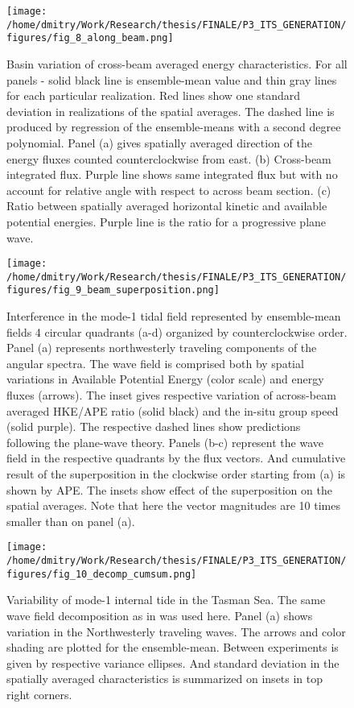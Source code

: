 \documentclass[12pt]{article}
\begin{document}
\begin{figure}
	\centering
	\texttt{[image: /home/dmitry/Work/Research/thesis/FINALE/P3\_ITS\_GENERATION/figures/fig\_8\_along\_beam.png]}
	\caption{Basin variation of cross-beam averaged energy characteristics. For all panels - solid 
	black line is ensemble-mean value and thin gray lines for each particular realization. Red 
	lines show one standard deviation in realizations of the spatial averages. The dashed line is 
	produced by regression of the ensemble-means with a second degree polynomial. Panel (a) gives 
	spatially averaged direction of the energy fluxes counted counterclockwise from east. (b) 
	Cross-beam integrated flux. Purple line shows same integrated flux but with no account for 
	relative angle with respect to across beam section. (c) Ratio between spatially averaged 
	horizontal kinetic and available potential energies. Purple line is the ratio for a progressive 
	plane wave.}
	\label{C3.fig:beam_prms}
\end{figure}

\begin{figure}
	\centering
	\texttt{[image: /home/dmitry/Work/Research/thesis/FINALE/P3\_ITS\_GENERATION/figures/fig\_9\_beam\_superposition.png]}
	\caption{Interference in the mode-1 tidal field represented by ensemble-mean fields 4 circular 	
	quadrants (a-d) organized by counterclockwise order. Panel (a) represents northwesterly 
	traveling components of the angular spectra. The wave field is comprised both by spatial 
	variations in Available Potential Energy (color scale) and energy fluxes (arrows). The inset 
	gives respective variation of across-beam averaged HKE/APE ratio (solid black) and the in-situ 
	group speed (solid purple). The respective dashed lines show predictions following the  
	plane-wave theory. Panels (b-c) represent the wave field in the respective quadrants by the 
	flux vectors. And cumulative result of the superposition in the clockwise order starting from 
	(a) is shown by APE. The insets show effect of the superposition on the spatial averages. Note 
	that here the vector magnitudes are 10 times smaller than on panel (a).}
	\label{C3.fig:beam_dcmp}
\end{figure}

\begin{figure}
	\centering
	\texttt{[image: /home/dmitry/Work/Research/thesis/FINALE/P3\_ITS\_GENERATION/figures/fig\_10\_decomp\_cumsum.png]}
	\caption{Variability of mode-1 internal tide in the Tasman Sea. The same wave field 
	decomposition as in  was used here. Panel (a) shows variation in the 
	Northwesterly traveling waves. The arrows and color shading are plotted for the ensemble-mean. 
	Between experiments is given by respective variance ellipses. And standard deviation in the 
	spatially averaged characteristics is summarized on insets in top right corners.}
	\label{C3.fig:beam_dcmp_cm}
\end{figure}
\end{document}
